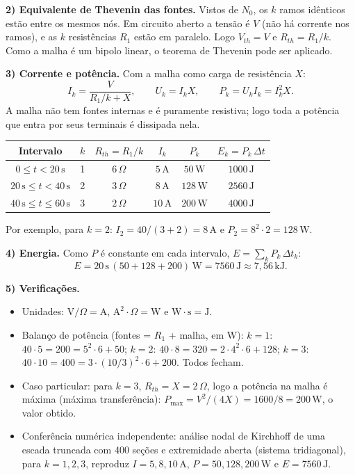 \documentclass{article}%
\begin{document}
\textbf{2) Equivalente de Thevenin das fontes.} Vistos de $N_0$, os $k$ ramos idênticos estão entre os mesmos nós. Em circuito aberto a tensão é $V$ (não há corrente nos ramos), e as $k$ resistências $R_1$ estão em paralelo. Logo $V_{th}=V$ e $R_{th}=R_1/k$. Como a malha é um bipolo linear, o teorema de Thevenin pode ser aplicado.

\textbf{3) Corrente e potência.} Com a malha como carga de resistência $X$:
\[
I_k=\frac{V}{R_1/k+X}, \qquad U_k=I_kX, \qquad P_k=U_kI_k=I_k^{2}X .
\]
A malha não tem fontes internas e é puramente resistiva; logo toda a potência que entra por seus terminais é dissipada nela.

\begin{center}
\begin{tabular}{c c c c c c}
Intervalo & $k$ & $R_{th}=R_1/k$ & $I_k$ & $P_k$ & $E_k=P_k\,\Delta t$ \\
\hline
$0\le t<20\,\text{s}$ & 1 & $6\,\Omega$ & $5\,\text{A}$ & $50\,\text{W}$ & $1000\,\text{J}$ \\
$20\,\text{s}\le t<40\,\text{s}$ & 2 & $3\,\Omega$ & $8\,\text{A}$ & $128\,\text{W}$ & $2560\,\text{J}$ \\
$40\,\text{s}\le t\le 60\,\text{s}$ & 3 & $2\,\Omega$ & $10\,\text{A}$ & $200\,\text{W}$ & $4000\,\text{J}$ \\
\end{tabular}
\end{center}

Por exemplo, para $k=2$: $I_2=40/(3+2)=8\,\text{A}$ e $P_2=8^2\cdot 2=128\,\text{W}$.

\textbf{4) Energia.} Como $P$ é constante em cada intervalo, $E=\sum_k P_k\,\Delta t_k$:
\[
E=20\,\text{s}\,(50+128+200)\,\text{W}=7560\,\text{J}\approx 7{,}56\,\text{kJ}.
\]

\textbf{5) Verificações.}
\begin{itemize}
\item Unidades: $\text{V}/\Omega=\text{A}$, $\text{A}^2\cdot\Omega=\text{W}$ e $\text{W}\cdot\text{s}=\text{J}$.
\item Balanço de potência (fontes = $R_1$ + malha, em W): $k=1$: $40\cdot 5=200=5^2\cdot 6+50$; $k=2$: $40\cdot 8=320=2\cdot 4^2\cdot 6+128$; $k=3$: $40\cdot 10=400=3\cdot(10/3)^2\cdot 6+200$. Todos fecham.
\item Caso particular: para $k=3$, $R_{th}=X=2\,\Omega$, logo a potência na malha é máxima (máxima transferência): $P_{\max}=V^2/(4X)=1600/8=200\,\text{W}$, o valor obtido.
\item Conferência numérica independente: análise nodal de Kirchhoff de uma escada truncada com 400 seções e extremidade aberta (sistema tridiagonal), para $k=1,2,3$, reproduz $I=5, 8, 10\,\text{A}$, $P=50, 128, 200\,\text{W}$ e $E=7560\,\text{J}$.
\end{itemize}
\end{document}
